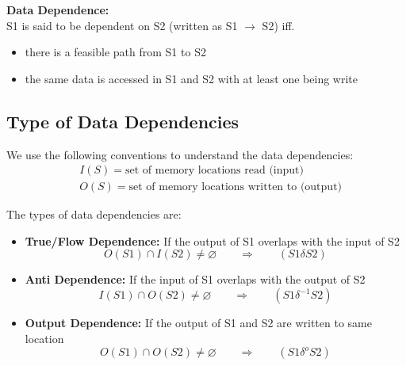 \documentclass[12pt, a4paper]{report}
\begin{document}
{\bfseries{Data Dependence:}}\\
S1 is said to be dependent on S2 (written as S1 $\rightarrow$ S2) iff. 
\begin{itemize}
    \item there is a feasible path from S1 to S2
    \item the same data is accessed in S1 and S2 with at least one being write
\end{itemize}

\subsection{Type of Data Dependencies}
We use the following conventions to understand the data dependencies:
\begin{equation*}
    \begin{aligned}
        & I(S) = \text{set of memory locations read (input)}\\
        & O(S) = \text{set of memory locations written to (output)}
    \end{aligned}
\end{equation*}

The types of data dependencies are:
\begin{itemize}
    \item {\bfseries{True/Flow Dependence:}} If the output of S1 overlaps with the input of S2
    \begin{equation*}
        O(S1) \cap I(S2) \neq \varnothing \qquad \Rightarrow \qquad (S1 \delta S2)
    \end{equation*}
    \item {\bfseries{Anti Dependence:}} If the input of S1 overlaps with the output of S2
    \begin{equation*}
        I(S1) \cap O(S2) \neq \varnothing \qquad \Rightarrow \qquad (S1 \delta^{-1} S2)
    \end{equation*}
    \item {\bfseries{Output Dependence:}} If the output of S1 and S2 are written to same location
    \begin{equation*}
        O(S1) \cap O(S2) \neq \varnothing \qquad \Rightarrow \qquad (S1 \delta^{o} S2)
    \end{equation*}
\end{itemize}
\end{document}
